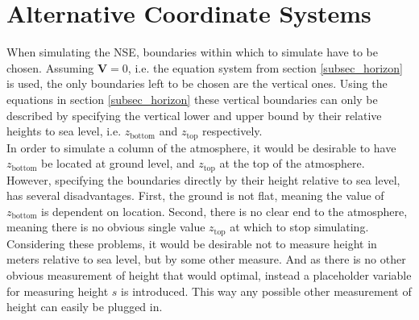 
\section{Alternative Coordinate Systems}
When simulating the NSE, boundaries within which to simulate have to be chosen.
Assuming $\textbf{V}=0$, i.e. the equation system from section \ref{subsec_horizon} is used, the only boundaries left to be chosen are the vertical ones.
Using the equations in section \ref{subsec_horizon} these vertical boundaries can only be described by specifying the vertical lower and upper bound by their relative heights to sea level, i.e. $z_{\text{bottom}}$ and $z_{\text{top}}$ respectively.
\\
In order to simulate a column of the atmosphere, it would be desirable to have $z_{\text{bottom}}$ be located at ground level, and $z_{\text{top}}$ at the top of the atmosphere.
\\
However, specifying the boundaries directly by their height relative to sea level, has several disadvantages.
First, the ground is not flat, meaning the value of $z_{\text{bottom}}$ is dependent on location.
Second, there is no clear end to the atmosphere, meaning there is no obvious single value $z_{\text{top}}$ at which to stop simulating.
\\
Considering these problems, it would be desirable not to measure height in meters relative to sea level, but by some other measure.
And as there is no other obvious measurement of height that would optimal, instead a placeholder variable for measuring height $s$ is introduced.
This way any possible other measurement of height can easily be plugged in.
